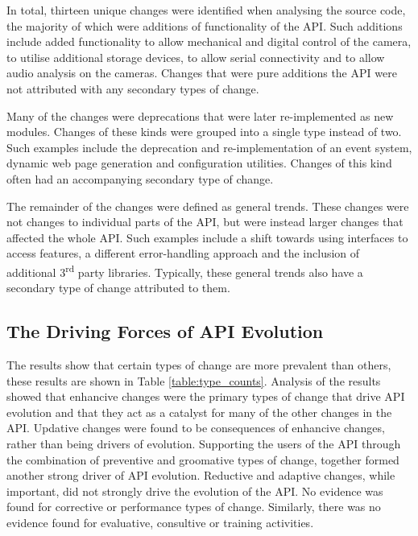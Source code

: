 \documentclass{sig-alternate}
\begin{document}
In total, thirteen unique changes were identified when analysing the source code, the majority of which were additions of functionality of the API. Such additions include added functionality to allow mechanical and digital control of the camera, to utilise additional storage devices, to allow serial connectivity and to allow audio analysis on the cameras. Changes that were pure additions the API were not attributed with any secondary types of change.

Many of the changes were deprecations that were later re-implemented as new modules. Changes of these kinds were grouped into a single type instead of two. Such examples include the deprecation and re-implementation of an event system, dynamic web page generation and configuration utilities. Changes of this kind often had an accompanying secondary type of change.

The remainder of the changes were defined as general trends. These changes were not changes to individual parts of the API, but were instead larger changes that affected the whole API. Such examples include a shift towards using interfaces to access features, a different error-handling approach and the inclusion of additional 3\textsuperscript{rd} party libraries. Typically, these general trends also have a secondary type of change attributed to them.



\subsection{The Driving Forces of API Evolution} \label{results_rq1}

The results show that certain types of change are more prevalent than others, these results are shown in Table \ref{table:type_counts}. Analysis of the results showed that enhancive changes were the primary types of change that drive API evolution and that they act as a catalyst for many of the other changes in the API. Updative changes were found to be consequences of enhancive changes, rather than being drivers of evolution. Supporting the users of the API through the combination of preventive and groomative types of change, together formed another strong driver of API evolution. Reductive and adaptive changes, while important, did not strongly drive the evolution of the API. No evidence was found for corrective or performance types of change. Similarly, there was no evidence found for evaluative, consultive or training activities.    
\end{document}
